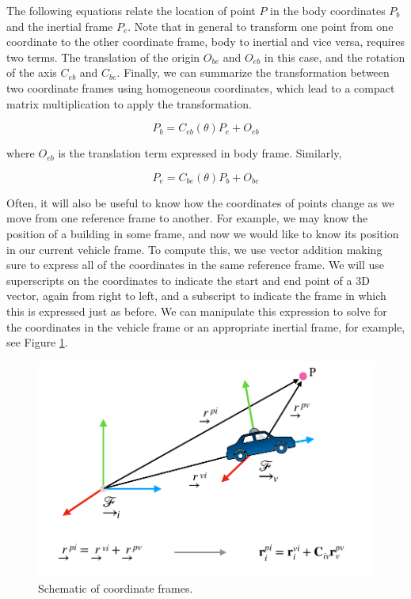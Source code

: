 The following equations relate the location of point $P$ in the body coordinates $P_b$ and the inertial frame $P_e$. 
Note that in general to transform one point from one coordinate to the other coordinate frame, body to inertial and vice versa, requires two terms. The translation of the origin $O_{be}$ and $O_{eb}$ in this case, and the rotation of the axis $C_{eb}$ and $C_{be}$. Finally, we can summarize the transformation between two coordinate frames using homogeneous coordinates, which lead to a compact matrix multiplication to apply the transformation. 

\begin{equation}
P_b = C_{eb}(\theta)P_e + O_{eb}
\end{equation}

where $O_{eb}$ is the translation term expressed in body frame. Similarly,

\begin{equation}
P_e = C_{be}(\theta)P_b + O_{be}
\end{equation}






Often, it will also be useful to know how the coordinates of points change as we move from
one reference frame to another. For example, we may know the position
of a building in some frame, and now we would like to know its position in our current vehicle frame. 
To compute this, we use vector addition making sure to express all of the
coordinates in the same reference frame. We will use superscripts on the coordinates to indicate the start and
end point of a 3D vector, again from right to left, and a subscript to indicate
the frame in which this is expressed just as before. We can manipulate this expression
to solve for the coordinates in the vehicle frame or an appropriate
inertial frame, for example, see Figure \ref{coordinate_rotations_2}.

\begin{figure}[!htb]
\begin{center}
\includegraphics[scale=0.290]{img/coordinate_transforms/coordinate_rotations_2.jpeg}
\end{center}
\caption{Schematic of coordinate frames.}
\label{coordinate_rotations_2}
\end{figure}


